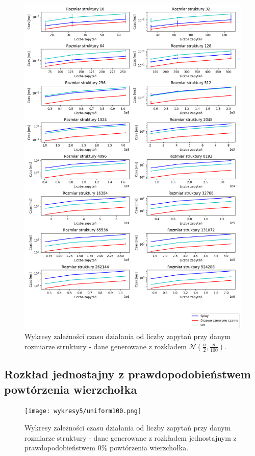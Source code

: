 \documentclass[declaration,shortabstract]{iithesis}
\theoremstyle{thm}
\theoremstyle{remark}
\theoremstyle{plain}
\theoremstyle{plain}
\theoremstyle{plain}
\begin{document}
\begin{figure}[H]  
\centering
    \includegraphics[scale=0.45]{wykresy3/gaus1.png}
      \caption{Wykresy zależności czasu działania od liczby zapytań przy danym rozmiarze struktury - dane generowane z rozkładem \(\mathcal{N}(\frac{n}{2}, \frac{n}{100})\). }  
\end{figure}

\subsection{Rozkład jednostajny z prawdopodobieństwem powtórzenia wierzchołka}

\begin{figure}[H]  
\centering
    \texttt{[image: wykresy5/uniform100.png]}
      \caption{Wykresy zależności czasu działania od liczby zapytań przy danym rozmiarze struktury - dane generowane z rozkładem jednostajnym z prawdopodobieństwem  \(0\%\) powtórzenia wierzchołka. }  
\end{figure}
\end{document}
